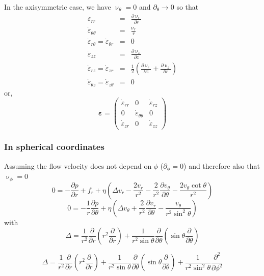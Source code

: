 In the axisymmetric case, we have $\upnu_\theta=0$ and $\partial_\theta \rightarrow 0$ so that 
\begin{eqnarray}
\dot\varepsilon_{rr} &=& \frac{\partial \upnu_r}{\partial r}  \\
\dot\varepsilon_{\theta\theta} &=& \frac{\upnu_r}{r} \\
\dot\varepsilon_{r\theta} = \dot\varepsilon_{\theta r} &=& 0\\
\dot\varepsilon_{zz} &=& \frac{\partial \upnu_z}{\partial z} \\
\dot{\varepsilon}_{rz} = \dot{\varepsilon}_{zr} 
&=& \frac{1}{2}\left( \frac{\partial \upnu_r}{\partial z} + \frac{\partial \upnu_z}{\partial r}  \right) \\
\dot{\varepsilon}_{\theta z} = \dot{\varepsilon}_{z \theta} &=& 0
\end{eqnarray}
or, 
\[
\dot{\bm\varepsilon}
=
\left(
\begin{array}{ccc}
\dot\varepsilon_{rr} & 0 & \dot{\varepsilon}_{rz} \\
0 & \dot{\varepsilon}_{\theta\theta}  & 0 \\
\dot{\varepsilon}_{zr} & 0 & \dot\varepsilon_{zz}
\end{array}
\right)
\]






\subsubsection{In spherical coordinates}




Assuming the flow velocity does not depend on $\phi$ ($\partial_\phi =0$) and therefore also that $\upnu_\phi=0$
\[
0=-\frac{\partial p}{\partial r} + f_r + \eta \left(\Delta v_r - \frac{2v_r}{r^2} -\frac{2}{r^2} \frac{\partial v_\theta}{\partial \theta} - \frac{2 v_\theta \cot \theta }{r^2} \right)
\]
\[
0 = -\frac{1}{r} \frac{\partial p}{\partial \theta} + \eta \left(\Delta v_\theta + \frac{2}{r^2} \frac{\partial v_r}{\partial \theta}  - \frac{v_\theta}{r^2 \sin^2 \theta} \right)
\]
with
\[
\Delta = \frac{1}{r^2} \frac{\partial }{\partial r}\left( r^2 \frac{\partial }{\partial r}\right)
+\frac{1}{r^2 \sin\theta} \frac{\partial }{\partial \theta}
\left(
\sin\theta \frac{\partial }{\partial\theta}
\right)
\]


\[
\Delta = \frac{1}{r^2} \frac{\partial }{\partial r}\left( r^2 \frac{\partial }{\partial r}\right)
+\frac{1}{r^2 \sin\theta} \frac{\partial }{\partial \theta}
\left(
\sin\theta \frac{\partial }{\partial\theta}
\right)
+ \frac{1}{r^2 \sin^2\theta} \frac{\partial^2 }{\partial\phi^2}
\]

